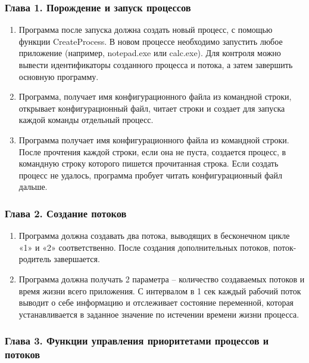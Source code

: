 \documentclass[14pt,a4paper,report]{report}
\begin{document}
\subsubsection{Глава 1. Порождение и запуск процессов}

\begin{enumerate}
	\item Программа после запуска должна создать новый процесс, с помощью функции CreateProcess.
	В новом процессе необходимо запустить любое приложение (например, notepad.exe или calc.exe). Для контроля можно вывести идентификаторы созданного процесса и потока, а затем завершить основную программу.
	\item Программа, получает имя конфигурационного файла из командной строки, открывает конфигурационный файл, читает строки и создает для запуска каждой команды отдельный процесс.
	\item Программа получает имя конфигурационного файла из командной строки. После прочтения каждой строки, если она не пуста, создается процесс, в командную строку которого пишется прочитанная строка. Если создать процесс не удалось, программа пробует читать конфигурационный файл дальше.
\end{enumerate}

\subsubsection{Глава 2. Создание потоков}

\begin{enumerate}
	\item Программа должна создавать два потока, выводящих в бесконечном цикле «1» и «2» соответственно. После создания дополнительных потоков, поток-родитель завершается.
	\item Программа должна получать 2 параметра – количество создаваемых потоков и время жизни всего приложения. С интервалом в 1 сек каждый рабочий поток выводит о себе информацию и отслеживает состояние переменной, которая устанавливается в заданное значение по истечении времени жизни процесса.
\end{enumerate}

\subsubsection{Глава 3. Функции управления приоритетами процессов и потоков}
\end{document}
